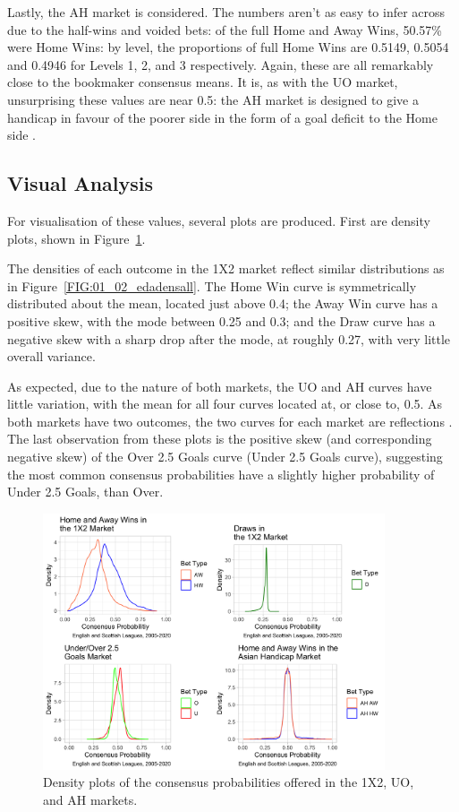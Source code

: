 \documentclass[a4paper,10pt]{report}
\begin{document}
Lastly, the AH market is considered. The numbers aren't as easy to infer across due to the half-wins and voided bets: of the full Home and Away Wins, 50.57\% were Home Wins: by level, the proportions of full Home Wins are 0.5149, 0.5054 and 0.4946 for Levels 1, 2, and 3 respectively. Again, these are all remarkably close to the bookmaker consensus means. It is, as with the UO market, unsurprising these values are near 0.5: the AH market is designed to give a handicap in favour of the poorer side in the form of a goal deficit to the Home side \autocite{constantinou20}. 

\subsection*{Visual Analysis}
For visualisation of these values, several plots are produced. First are density plots, shown in Figure~\ref{FIG:02_01_densityplots}. \vspace{3mm}

The densities of each outcome in the 1X2 market reflect similar distributions as in Figure~\ref{FIG:01_02_edadensall}. The Home Win curve is symmetrically distributed about the mean, located just above 0.4; the Away Win curve has a positive skew, with the mode between 0.25 and 0.3; and the Draw curve has a negative skew with a sharp drop after the mode, at roughly 0.27, with very little overall variance. 

As expected, due to the nature of both markets, the UO and AH curves have little variation, with the mean for all four curves located at, or close to, 0.5. As both markets have two outcomes, the two curves for each market are reflections \autocite{reflection}. The last observation from these plots is the positive skew (and corresponding negative skew) of the Over 2.5 Goals curve (Under 2.5 Goals curve), suggesting the most common consensus probabilities have a slightly higher probability of Under 2.5 Goals, than Over.\vspace{3mm}

\begin{figure}[h!]\begin{center}
	\includegraphics[width=0.9\textwidth]{ensco_04A_densities.png}
	\caption{Density plots of the consensus probabilities offered in the 1X2, UO, and AH markets.}\label{FIG:02_01_densityplots}
\end{center}\end{figure}
\end{document}
